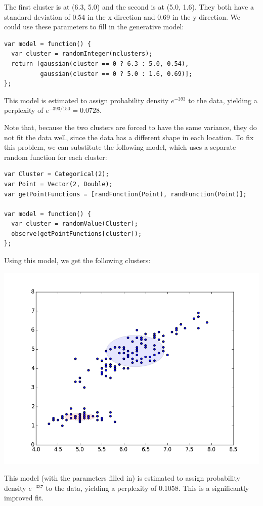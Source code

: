\documentclass{article}
\begin{document}
  The first cluster is at (6.3, 5.0) and the second is at (5.0, 1.6).  They both
  have a standard deviation of 0.54 in the x direction and 0.69 in the y direction.
  We could use these parameters to fill in the generative model:
  \begin{lstlisting}
var model = function() {
  var cluster = randomInteger(nclusters);
  return [gaussian(cluster == 0 ? 6.3 : 5.0, 0.54),
          gaussian(cluster == 0 ? 5.0 : 1.6, 0.69)];
};
  \end{lstlisting}
  This model is estimated to assign probability density $e^{-393}$ to the data, yielding a perplexity of $e^{-393/150} = 0.0728$.

  Note that, because the two clusters are forced to have the same variance, they do not fit the data well,
  since the data has a different shape in each location.  To fix this problem, we can substitute the following
  model, which uses a separate random function for each cluster:
  \begin{lstlisting}
var Cluster = Categorical(2);
var Point = Vector(2, Double);
var getPointFunctions = [randFunction(Point), randFunction(Point)];

var model = function() {
  var cluster = randomValue(Cluster);
  observe(getPointFunctions[cluster]);
};
\end{lstlisting}
  Using this model, we get the following clusters:
  \begin{center}
    \includegraphics[scale=0.5]{../plots/irisclusters_indep.png}
  \end{center}
  This model (with the parameters filled in) is estimated to assign probability density $e^{-337}$ to the data, yielding a perplexity of 0.1058.  This is a significantly improved fit.
\end{document}

